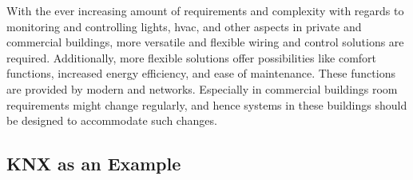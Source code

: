 
\label{sec:background:bas:intro}

With the ever increasing amount of requirements and complexity with regards to monitoring and controlling lights, \acs{hvac}, and other aspects in private and commercial buildings, more versatile and flexible wiring and control solutions are required. 
Additionally, more flexible solutions offer possibilities like comfort functions, increased energy efficiency, and ease of maintenance. \parencite{Merz2009}
These functions are provided by modern  and networks.
Especially in commercial buildings room requirements might change regularly, and hence systems in these buildings should be designed to accommodate such changes. \parencite{Merz2009} 

\subsection{KNX as an Example}
\label{sec:background:bas:knx}

